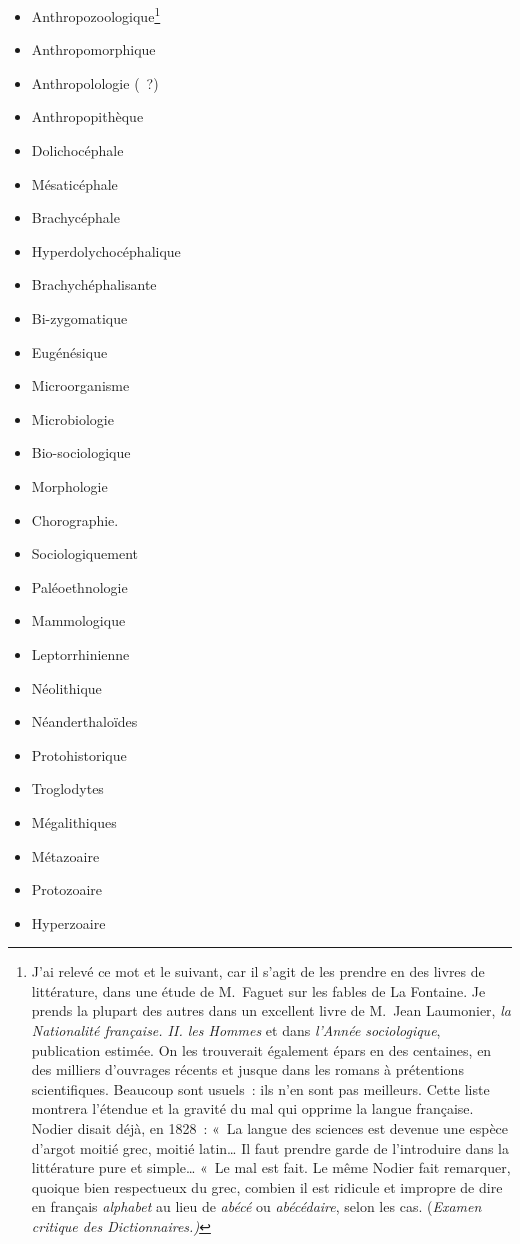 \documentclass[french,twoside]{book} %
\begin{document}
\begin{itemize}[itemsep=0pt,]
\item Anthropozoologique\footnote{ J’ai relevé ce mot et le suivant, car il s’agit de les prendre en des livres de littérature, dans une étude de M. Faguet sur les fables de La Fontaine. Je prends la plupart des autres dans un excellent livre de M. Jean Laumonier, {\itshape la Nationalité française. II. les Hommes} et dans {\itshape l’Année sociologique}, publication estimée. On les trouverait également épars en des centaines, en des milliers d’ouvrages récents et jusque dans les romans à prétentions scientifiques. Beaucoup sont usuels : ils n’en sont pas meilleurs. Cette liste montrera l’étendue et la gravité du mal qui opprime la langue française. Nodier disait déjà, en 1828 : « La langue des sciences est devenue une espèce d’argot moitié grec, moitié latin… Il faut prendre garde de l’introduire dans la littérature pure et simple… « Le mal est fait. Le même Nodier fait remarquer, quoique bien respectueux du grec, combien il est ridicule et impropre de dire en français {\itshape alphabet} au lieu de {\itshape abécé} ou {\itshape abécédaire}, selon les cas. ({\itshape Examen critique des Dictionnaires.)}} 
\item Anthropomorphique
\item Anthropolologie ( ?)
\item Anthropopithèque
\item Dolichocéphale
\item Mésaticéphale
\item Brachycéphale
\item Hyperdolychocéphalique
\item Brachychéphalisante
\item Bi-zygomatique
\item Eugénésique
\item Microorganisme
\item Microbiologie
\item Bio-sociologique
\item Morphologie
\item Chorographie.
\item Sociologiquement
\item Paléoethnologie
\item Mammologique
\item Leptorrhinienne
\item Néolithique
\item Néanderthaloïdes
\item Protohistorique
\item Troglodytes
\item Mégalithiques
\item Métazoaire
\item Protozoaire
\item Hyperzoaire
\end{itemize}
\end{document}
